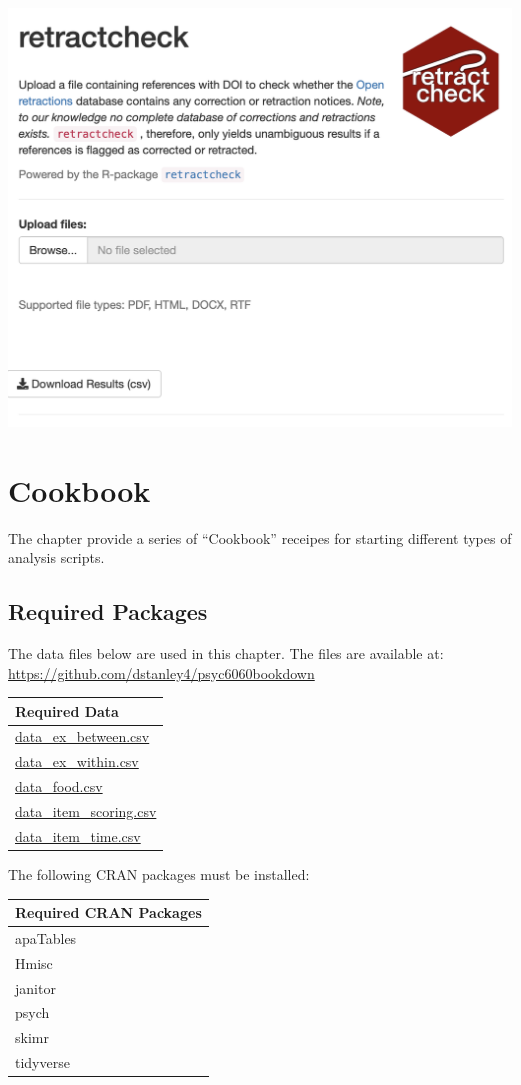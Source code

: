 \documentclass[
]{krantz}
\begin{document}
\includegraphics[width=0.6\linewidth]{ch_tools/images/retractcheck_website}

\hypertarget{cookbook}{%
\chapter{Cookbook}\label{cookbook}}

The chapter provide a series of ``Cookbook'' receipes for starting different types of analysis scripts.

\hypertarget{required-packages-1}{%
\section{Required Packages}\label{required-packages-1}}

The data files below are used in this chapter. The files are available at: \url{https://github.com/dstanley4/psyc6060bookdown}

\begin{longtable}[]{@{}l@{}}
\toprule
Required Data \\
\midrule
\endhead
\url{data_ex_between.csv} \\
\url{data_ex_within.csv} \\
\url{data_food.csv} \\
\url{data_item_scoring.csv} \\
\url{data_item_time.csv} \\
\bottomrule
\end{longtable}

The following CRAN packages must be installed:

\begin{longtable}[]{@{}l@{}}
\toprule
Required CRAN Packages \\
\midrule
\endhead
apaTables \\
Hmisc \\
janitor \\
psych \\
skimr \\
tidyverse \\
\bottomrule
\end{longtable}
\end{document}
